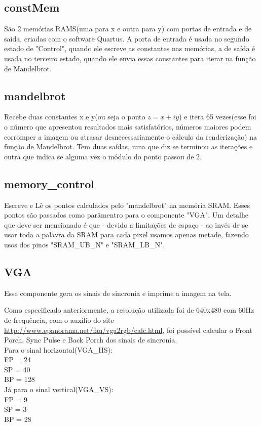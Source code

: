 \documentclass[a4paper, 12pt]{article}
\begin{document}
\subsection{constMem}
São 2 memórias RAMS(uma para x e outra para y) com portas de entrada e de saída, criadas com o software Quartus. A porta de entrada é usada no segundo estado de "Control", quando ele escreve as constantes nas memórias, a de saída é usada no terceiro estado, quando ele envia essas constantes para iterar na função de Mandelbrot.\\
\subsection{mandelbrot}
Recebe duas constantes x e y(ou seja o ponto $z = x + iy$) e itera 65 vezes(esse foi o número que apresentou resultados mais satisfatórios, números maiores podem corromper a imagem ou atrasar desnecessariamente o cálculo da renderização) na função de Mandelbrot. Tem duas saídas, uma que diz se terminou as iterações e outra que indica se alguma vez o módulo do ponto passou de 2.
\subsection{memory\_control}
Escreve e Lê os pontos calculados pelo "mandelbrot" na memória SRAM. Esses pontos são passados como parâmentro para o componente "VGA". Um detalhe que deve ser mencionado é que - devido a limitações de espaço - ao invés de se usar toda a palavra da SRAM para cada pixel usamos apenas metade, fazendo usos dos pinos "SRAM\_UB\_N" e "SRAM\_LB\_N".
\subsection{VGA}
Esse componente gera os sinais de sincronia e imprime a imagem na tela.

Como especificado anteriormente, a resolução utilizada foi de 640x480 com 60Hz de frequência, com o auxílio do site \url{http://www.epanorama.net/faq/vga2rgb/calc.html}, foi possível calcular o Front Porch, Sync Pulse e Back Porch dos sinais de sincronia.\\ Para o sinal horizontal(VGA\_HS):\\
FP = 24\\
SP = 40\\
BP = 128\\
Já para o sinal vertical(VGA\_VS):\\
FP = 9\\
SP = 3\\
BP = 28\\
\end{document}
